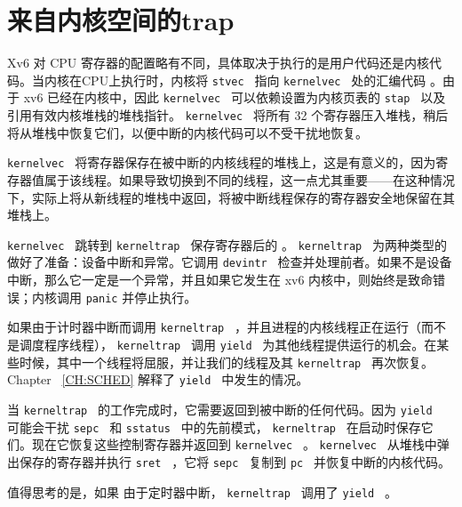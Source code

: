    \section{来自内核空间的trap}   
    \label{s:ktraps}     

Xv6 对 CPU 寄存器的配置略有不同，具体取决于执行的是用户代码还是内核代码。当内核在CPU上执行时，内核将 {    \tt    stvec   } 指向 {    \tt    kernelvec   } 处的汇编代码
    。由于 xv6 已经在内核中，因此  {    \tt    kernelvec   }  可以依赖设置为内核页表的  {    \tt    stap   }  以及引用有效内核堆栈的堆栈指针。
  {    \tt    kernelvec   }  将所有 32 个寄存器压入堆栈，稍后将从堆栈中恢复它们，以便中断的内核代码可以不受干扰地恢复。  

 {    \tt    kernelvec   }  将寄存器保存在被中断的内核线程的堆栈上，这是有意义的，因为寄存器值属于该线程。如果导致切换到不同的线程，这一点尤其重要——在这种情况下，实际上将从新线程的堆栈中返回，将被中断线程保存的寄存器安全地保留在其堆栈上。  

 {    \tt    kernelvec   }  跳转到  {    \tt    kerneltrap   } 
 保存寄存器后的       。
  {    \tt    kerneltrap   }  为两种类型的做好了准备：设备中断和异常。它调用
  {    \tt    devintr   } 
      检查并处理前者。如果不是设备中断，那么它一定是一个异常，并且如果它发生在 xv6 内核中，则始终是致命错误；内核调用    \lstinline{panic}    并停止执行。  

如果由于计时器中断而调用  {    \tt    kerneltrap   } ，并且进程的内核线程正在运行（而不是调度程序线程），
  {    \tt    kerneltrap   }  调用  {    \tt    yield   }  为其他线程提供运行的机会。在某些时候，其中一个线程将屈服，并让我们的线程及其  {    \tt    kerneltrap   }  再次恢复。 Chapter~    \ref{CH:SCHED}    解释了  {    \tt    yield   }  中发生的情况。  

当  {    \tt    kerneltrap   }  的工作完成时，它需要返回到被中断的任何代码。因为  {    \tt    yield   }  可能会干扰  {    \tt    sepc   }  和  {    \tt    sstatus   }  中的先前模式，
  {    \tt    kerneltrap   }  在启动时保存它们。现在它恢复这些控制寄存器并返回到  {    \tt    kernelvec   } 
     。
  {    \tt    kernelvec   }  从堆栈中弹出保存的寄存器并执行  {    \tt    sret   }  ，它将  {    \tt    sepc   }  复制到  {    \tt    pc   }  并恢复中断的内核代码。  

值得思考的是，如果
 由于定时器中断， {    \tt    kerneltrap   }  调用了  {    \tt    yield   } 。  

